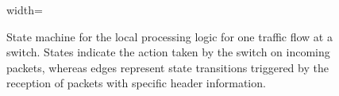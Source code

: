 \begin{figure}
\begin{adjustbox}{width=\columnwidth}
    \end{adjustbox}
    \vspace{-2\baselineskip}
    \caption{State machine for the local processing logic for one traffic flow at a switch. States indicate the action taken by the switch on incoming packets, whereas edges represent state transitions triggered by the reception of packets with specific \name header information.}
\label{fig:state_machine}

\end{figure}